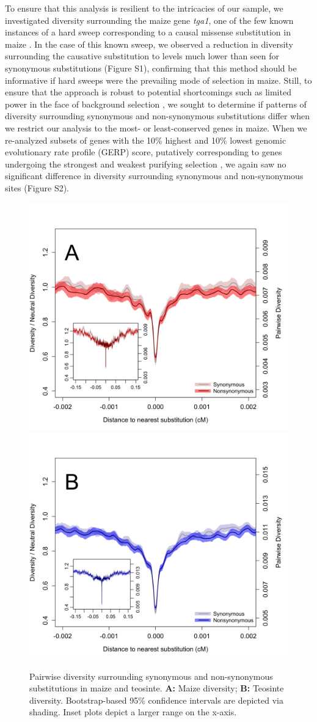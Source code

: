 \documentclass{pnastwo}
\begin{document}
\begin{article}
To ensure that this analysis is resilient to the intricacies of our sample, we investigated diversity surrounding the maize gene \emph{tga1}, one of the few known instances of a hard sweep corresponding to a causal missense substitution in maize \cite{wang2015}. In the case of this known sweep, we observed a reduction in diversity surrounding the causative substitution to levels much lower than seen for synonymous substitutions (Figure S1), confirming that this method should be informative if hard sweeps were the prevailing mode of selection in maize. Still, to ensure that the approach is robust to potential shortcomings such as limited power in the face of background selection \cite{enard2014}, we sought to determine if patterns of diversity surrounding synonymous and non-synonymous substitutions differ when we restrict our analysis to the most- or least-conserved genes in maize. When we re-analyzed subsets of genes with the 10\% highest and 10\% lowest genomic evolutionary rate profile (GERP) score, putatively corresponding to genes undergoing the strongest and weakest purifying selection \cite{davydov2010, cooper2005, rodgers2015}, we again saw no significant difference in diversity surrounding synonymous and non-synonymous sites (Figure S2).

\begin{figure}[!htb]
\centering
\includegraphics[width=.45\textwidth]{FigsAndFiles/plotDiversity_TvM_Folded2_Significance_June}
\hspace{0.05\textwidth} \includegraphics[width=.45\textwidth]{FigsAndFiles/plotDiversity_TvT_Folded2_Significance_June}
\caption{Pairwise diversity surrounding synonymous and non-synonymous
  substitutions in maize and teosinte. {\bf A:} Maize diversity; {\bf B:} Teosinte
diversity. Bootstrap-based 95\% confidence intervals are depicted via shading. Inset plots depict a larger range on the x-axis. \label{fig:hardSweeps}}
\end{figure}


\end{article}
\end{document}
